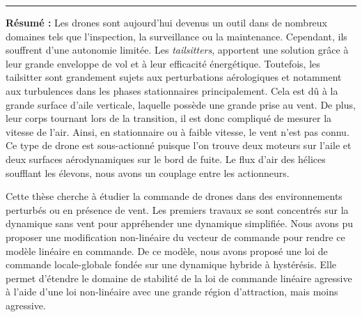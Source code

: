 \pagestyle{empty} %

\begin{vcenterpage} %
\noindent\rule[2pt]{\textwidth}{0.5pt}

{\large\textbf{Résumé :}}
Les drones sont aujourd'hui devenus un outil dans de nombreux domaines tels que l'inspection, la surveillance ou la maintenance. Cependant, ils souffrent d'une autonomie limitée. Les \textit{tailsitters}, apportent une solution grâce à leur grande enveloppe de vol et à leur efficacité énergétique. Toutefois, les tailsitter sont grandement sujets aux perturbations aérologiques et notamment aux turbulences dans les phases stationnaires principalement. Cela est dû à la grande surface d'aile verticale, laquelle possède une grande prise au vent. De plus, leur corps tournant lors de la transition, il est donc compliqué de mesurer la vitesse de l'air.  Ainsi, en stationnaire ou à faible vitesse, le vent n'est pas connu. Ce type de drone est sous-actionné puisque l'on trouve deux moteurs sur l'aile et deux surfaces aérodynamiques sur le bord de fuite. Le flux d'air des hélices soufflant les élevons, nous avons un couplage entre les actionneurs.

Cette thèse cherche à étudier la commande de drones dans des environnements perturbés ou en présence de vent. Les premiers travaux se sont concentrés sur la dynamique sans vent pour appréhender une dynamique simplifiée. Nous avons pu proposer une modification non-linéaire du vecteur de commande pour rendre ce modèle linéaire en commande. De ce modèle, nous avons proposé une loi de commande locale-globale fondée sur une dynamique hybride à hystérésis. Elle permet d'étendre le domaine de stabilité de la loi de commande linéaire agressive à l'aide d'une loi non-linéaire avec une grande région d'attraction, mais moins agressive.


\end{vcenterpage}
